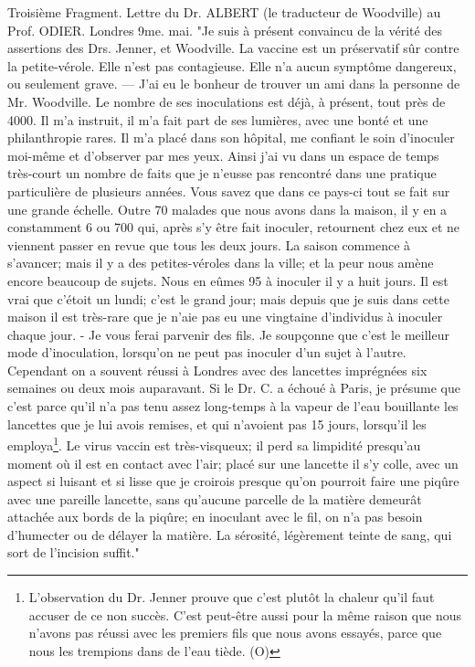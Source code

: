 Troisième Fragment. Lettre du Dr. ALBERT (le traducteur de Woodville) au Prof. ODIER. Londres 9me. mai.
"Je suis à présent convaincu de la vérité des assertions des Drs. Jenner, et Woodville. La vaccine est un préservatif sûr contre la petite-vérole. Elle n'est pas contagieuse. Elle n'a aucun symptôme dangereux, ou seulement grave. — J'ai eu le bonheur de trouver un ami dans la personne de Mr. Woodville. Le nombre de ses inoculations est déjà, à présent, tout près de 4000. Il m'a instruit, il m'a fait part de ses lumières, avec une bonté et une philanthropie rares. Il m'a placé dans son hôpital, me confiant le soin d'inoculer moi-même et d'observer par mes yeux. Ainsi j'ai vu dans un espace de temps très-court un nombre de faits que je n'eusse pas rencontré dans une pratique particulière de plusieurs années. Vous savez que dans ce pays-ci tout se fait sur une grande échelle. Outre 70 malades que nous avons dans la maison, il y en a constamment 6 ou 700 qui, après s'y être fait inoculer, retournent chez eux et ne viennent passer en revue que tous les deux jours. La saison commence à s'avancer; mais il y a des petites-véroles dans\setcounter{page}{283} la ville; et la peur nous amène encore beaucoup de sujets. Nous en eûmes 95 à inoculer il y a huit jours. Il est vrai que c'étoit un lundi; c'est le grand jour; mais depuis que je suis dans cette maison il est très-rare que je n'aie pas eu une vingtaine d'individus à inoculer chaque jour. - Je vous ferai parvenir des fils. Je soupçonne que c'est le meilleur mode d'inoculation, lorsqu'on ne peut pas inoculer d'un sujet à l'autre. Cependant on a souvent réussi à Londres avec des lancettes imprégnées six semaines ou deux mois auparavant. Si le Dr. C. a échoué à Paris, je présume que c'est parce qu'il n'a pas tenu assez long-temps à la vapeur de l'eau bouillante les lancettes que je lui avois remises, et qui n'avoient pas 15 jours, lorsqu'il les employa\footnote{L'observation du Dr. Jenner prouve que c'est plutôt la chaleur qu'il faut accuser de ce non succès. C'est peut-être aussi pour la même raison que nous n'avons pas réussi avec les premiers fils que nous avons essayés, parce que nous les trempions dans de l'eau tiède. (O)}. Le virus vaccin est très-visqueux; il perd sa limpidité presqu'au moment où il est en contact avec l'air; placé sur une lancette il s'y colle, avec un aspect si luisant et si lisse que je croirois presque qu'on pourroit faire une piqûre avec une pareille lancette,\setcounter{page}{284} sans qu'aucune parcelle de la matière demeurât attachée aux bords de la piqûre; en inoculant avec le fil, on n'a pas besoin d'humecter ou de délayer la matière. La sérosité, légèrement teinte de sang, qui sort de l'incision suffit."
